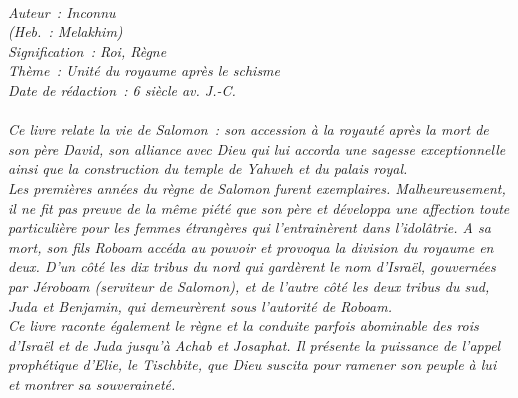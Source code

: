 \BFont
\noindent\hrulefill
{\footnotesize
\textit{
\bigskip
{\centering{}
\\Auteur~: Inconnu
\\(Heb.~: Melakhim)
\\Signification~: Roi, Règne
\\Thème~: Unité du royaume après le schisme
\\Date de rédaction~: 6 siècle av. J.-C.\\}
}
\textit{
\\Ce livre relate la vie de Salomon~: son accession à la royauté après la mort de son père David, son alliance avec Dieu qui lui accorda une sagesse exceptionnelle ainsi que la construction du temple de Yahweh et du palais royal.
\\Les premières années du règne de Salomon furent exemplaires. Malheureusement, il ne fit pas preuve de la même piété que son père et développa une affection toute particulière pour les femmes étrangères qui l'entrainèrent dans l'idolâtrie. A sa mort, son fils Roboam accéda au pouvoir et provoqua la division du royaume en deux. D'un côté les dix tribus du nord qui gardèrent le nom d'Israël, gouvernées par Jéroboam (serviteur de Salomon), et de l'autre côté les deux tribus du sud, Juda et Benjamin, qui demeurèrent sous l'autorité de Roboam.
\\Ce livre raconte également le règne et la conduite parfois abominable des rois d'Israël et de Juda jusqu'à Achab et Josaphat.
Il présente la puissance de l'appel prophétique d'Elie, le Tischbite, que Dieu suscita pour ramener son peuple à lui et
montrer sa souveraineté.\bigskip
}
}
\par\nobreak\noindent\hrulefill
